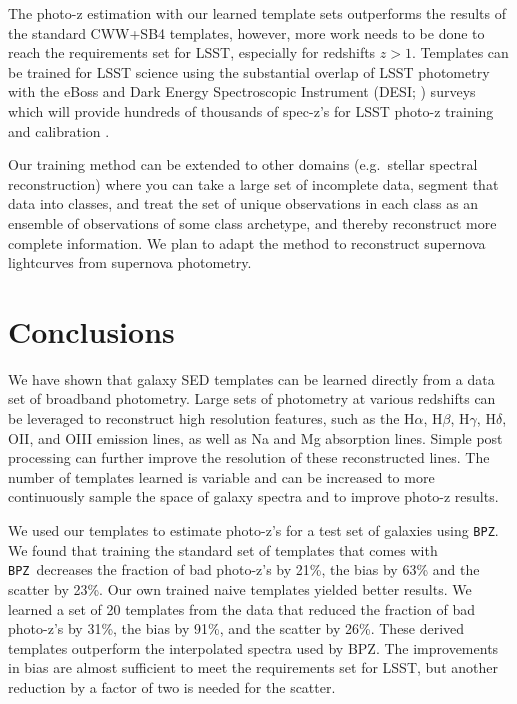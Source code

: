 \documentclass[twocolumn]{aastex63}
\newcommand{\pzcode}[1]{\texttt{#1}}
\newcommand{\bpz}{\pzcode{BPZ}}
\begin{document}
    The photo-z estimation with our learned template sets outperforms the results of the standard CWW+SB4 templates, however, more work needs to be done to reach the requirements set for LSST, especially for redshifts $z>1$.
    Templates can be trained for LSST science using the substantial overlap of LSST photometry with the eBoss \citep{Dawson2016} and Dark Energy Spectroscopic Instrument (DESI; \citealt{DESICollaboration2016}) surveys which will provide hundreds of thousands of spec-z's for LSST photo-z training and calibration \citep{Schmidt2014,Newman2015}.

    Our training method can be extended to other domains (e.g.\ stellar spectral reconstruction) where you can take a large set of incomplete data, segment that data into classes, and treat the set of unique observations in each class as an ensemble of observations of some class archetype, and thereby reconstruct more complete information.
    We plan to adapt the method to reconstruct supernova lightcurves from supernova photometry.
    
\section{Conclusions}
    \label{sect:conclusion}

    We have shown that galaxy SED templates can be learned directly from a data set of broadband photometry.
    Large sets of photometry at various redshifts can be leveraged to reconstruct high resolution features, such as the H$\alpha$, H$\beta$, H$\gamma$, H$\delta$, OII, and OIII emission lines, as well as Na and Mg absorption lines.
    Simple post processing can further improve the resolution of these reconstructed lines.
    The number of templates learned is variable and can be increased to more continuously sample the space of galaxy spectra and to improve photo-z results.

    We used our templates to estimate photo-z's for a test set of galaxies using \bpz.
    We found that training the standard set of templates that comes with \bpz\ decreases the fraction of bad photo-z's by 21\%, the bias by 63\% and the scatter by 23\%.
    Our own trained naive templates yielded better results.
    We learned a set of 20 templates from the data that reduced the fraction of bad photo-z's by 31\%, the bias by 91\%, and the scatter by 26\%.
    These derived templates outperform the interpolated spectra used by BPZ.
    The improvements in bias are almost sufficient to meet the requirements set for LSST, but another reduction by a factor of two is needed for the scatter.
\end{document}
